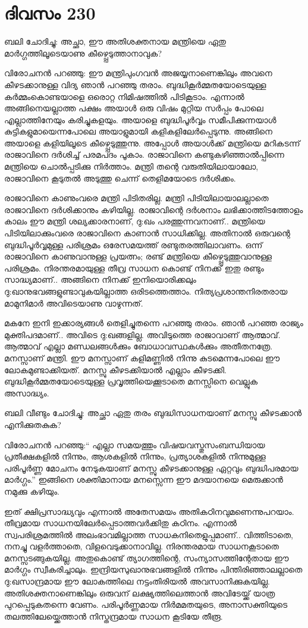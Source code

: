 \section{ദിവസം 230}


ബലി ചോദിച്ചു: അച്ഛാ, ഈ അതിശക്തനായ മന്ത്രിയെ ഏതു മാർഗ്ഗത്തിലൂടെയാണു കീഴ്പ്പെടുത്താനാവുക?

വിരോചനൻ പറഞ്ഞു: ഈ മന്ത്രിപുംഗവൻ അജയ്യനാണെങ്കിലും അവനെ കീഴടക്കാനുള്ള വിദ്യ ഞാൻ പറഞ്ഞു തരാം. ബുദ്ധികൂർമ്മതയോടെയുള്ള കർമ്മംകൊണ്ടയാളെ ഒരൊറ്റ നിമിഷത്തിൽ പിടികൂടാം. എന്നാൽ അങ്ങിനെയല്ലാത്ത പക്ഷം അയാൾ ഒരു വിഷം മുറ്റിയ സർപ്പം പോലെ എല്ലാത്തിനേയും കരിച്ചുകളയും. അയാളെ ബുദ്ധിപൂർവ്വം സമീപിക്കുന്നയാൾ കുട്ടികളുമായെന്നപോലെ അയാളുമായി കളികളിലേർപ്പെടുന്നു. അങ്ങിനെ അയാളെ കളിയിലൂടെ കീഴ്പ്പെടുത്തുന്നു. അപ്പോള്‍ അയാൾക്ക് മന്ത്രിയെ മറികടന്ന് രാജാവിനെ ദർശിച്ച് പരമപദം പൂകാം. രാജാവിനെ കണ്ടുകഴിഞ്ഞാൽപ്പിന്നെ മന്ത്രിയെ ചൊൽപ്പടിക്കു നിർത്താം. മന്ത്രി തന്റെ വരുതിയിലായാലോ, രാജാവിനെ കൂടുതൽ അടുത്തു ചെന്ന് തെളിമയോടെ ദർശിക്കം.

രാജാവിനെ കാണുംവരെ മന്ത്രി പിടിതരില്ല. മന്ത്രി പിടിയിലായാലല്ലാതെ രാജാവിനെ ദർശിക്കാനും കഴിയില്ല. രാജാവിന്റെ  ദർശനാം ലഭിക്കാത്തിടത്തോളം കാലം ഈ മന്ത്രി ശല്യക്കാരനാണ്‌, ദു:ഖം പരത്തുന്നവനാണ്‌.. മന്ത്രിയെ പിടിയിലാക്കുംവരെ രാജാവിനെ കാണാൻ സാധിക്കില്ല. അതിനാൽ ഒരുവന്റെ ബുദ്ധിപൂർവ്വമുള്ള പരിശ്രമം ഒരേസമയത്ത് രണ്ടുതരത്തിലാവണം. ഒന്ന് രാജാവിനെ കാണുവാനുള്ള പ്രയത്നം; രണ്ട് മന്ത്രിയെ കീഴ്പ്പെടുത്തുവാനുള്ള പരിശ്രമം. നിരന്തരമായുള്ള തീവ്ര സാധന കൊണ്ട് നിനക്ക് ഇതു രണ്ടും സാദ്ധ്യമാണ്‌.. അങ്ങിനെ നിനക്ക് ഇനിയൊരിക്കലും ദു:ഖാനുഭവങ്ങളുണ്ടാവുകയില്ലാത്ത ഒരിടത്തെത്താം. നിത്യപ്രശാന്തനിരതരായ മാമുനിമാർ അവിടെയാണു വാഴുന്നത്.

മകനേ ഇനി ഇക്കാര്യങ്ങൾ തെളിച്ചുതന്നെ പറഞ്ഞു തരാം. ഞാൻ പറഞ്ഞ രാജ്യം മുക്തിപദമാണ്‌.. അവിടെ ദു:ഖങ്ങളില്ല. അവിടുത്തെ രാജാവാണ്‌ ആത്മാവ്. ആത്മാവ് എല്ലാ മണ്ഡലങ്ങൾക്കും ബോധാവസ്ഥകൾക്കും അതീതനത്രേ. മനസ്സാണ്‌ മന്ത്രി. ഈ മനസ്സാണ്‌ കളിമണ്ണിൽ നിന്നു കുടമെന്നപോലെ ഈ ലോകമുണ്ടാക്കിയത്. മനസ്സു കീഴടക്കിയാൽ എല്ലാം കീഴടക്കി. ബുദ്ധികൂർമ്മതയോടെയുള്ള പ്രവൃത്തിയെക്കൂടാതെ മനസ്സിനെ വെല്ലുക അസാദ്ധ്യം.

ബലി വീണ്ടും ചോദിച്ചു: അച്ഛാ ഏതു തരം ബുദ്ധിസാധനയാണ്‌ മനസ്സു കീഴടക്കാൻ എനിക്കുതകുക?

വിരോചനൻ പറഞ്ഞു:“ എല്ലാ സമയത്തും വിഷയവസ്തുസംബന്ധിയായ പ്രതീക്ഷകളിൽ നിന്നും, ആശകളിൽ നിന്നും, പ്രത്യാശകളിൽ നിന്നുമുള്ള പരിപൂർണ്ണ മോചനം നേടുകയാണ്‌ മനസ്സു കീഴടക്കാനുള്ള ഏറ്റവും ബുദ്ധിപരമായ മാർഗ്ഗം.” ഇങ്ങിനെ ശക്തിമാനായ മനസ്സെന്ന ഈ മദയാനയെ മെരുക്കാൻ നമുക്കു കഴിയും.

ഇത് ക്ഷിപ്രസാദ്ധ്യവും എന്നാല്‍ അതേസമയം അതികഠിനവുമണെന്നുപറയാം. തീവ്രമായ സാധനയിലേർപ്പെടാത്തവർക്കിതു കഠിനം. എന്നാൽ സ്വപരിശ്രമത്തിൽ അലംഭാവമില്ലാത്ത സാധകനിതെളുപ്പമാണ്‌.. വിത്തിടാതെ, നനച്ചു വളര്‍ത്താതെ, വിളവെടുക്കാനാവില്ല. നിരന്തരമായ സാധനകൂടാതെ മനസ്സടങ്ങുകയില്ല. അതുകൊണ്ട് ത്യാഗത്തിന്റെ, സംന്യാസത്തിന്റേതായ ഈ മാർഗ്ഗം സ്വീകരിച്ചാലും. ഇന്ദ്രിയസുഖാനുഭവങ്ങളിൽ നിന്നും പിന്തിരിഞ്ഞാലല്ലാതെ ദു:ഖസാന്ദ്രമായ ഈ ലോകത്തിലെ നട്ടംതിരിയൽ അവസാനിക്കുകയില്ല. അതിശക്തനാണെങ്കിലും ഒരുവന്‌ ലക്ഷ്യത്തിലെത്താൻ അവിടേയ്ക്ക് യാത്ര പുറപ്പെടുകതന്നെ വേണം. പരിപൂർണ്ണമായ നിർമമതയുടെ, അനാസക്തിയുടെ തലത്തിലേയ്ക്കെത്താൻ നിസ്തന്ദ്രമായ സാധന കൂടിയേ തീരൂ. 
